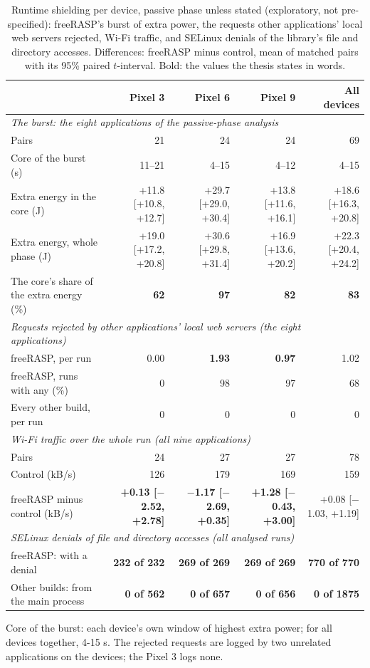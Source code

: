 \begin{table}[t]
\centering
\small
\caption{Runtime shielding per device, passive phase unless stated (exploratory, not pre-specified): freeRASP's burst of extra power, the requests other applications' local web servers rejected, Wi-Fi traffic, and SELinux denials of the library's file and directory accesses. Differences: freeRASP minus control, mean of matched pairs with its 95\% paired $t$-interval. Bold: the values the thesis states in words.}
\label{tab:freerasp-mechanism}
\begin{tabular}{lrrrr}
\toprule
\textbf{} & \textbf{Pixel 3} & \textbf{Pixel 6} & \textbf{Pixel 9} & \textbf{All devices} \\
\midrule
\multicolumn{5}{l}{\textit{The burst: the eight applications of the passive-phase analysis}} \\
Pairs & 21 & 24 & 24 & 69 \\
Core of the burst (s) & 11–21 & 4–15 & 4–12 & 4–15 \\
Extra energy in the core (J) & +11.8 [+10.8, +12.7] & +29.7 [+29.0, +30.4] & +13.8 [+11.6, +16.1] & +18.6 [+16.3, +20.8] \\
Extra energy, whole phase (J) & +19.0 [+17.2, +20.8] & +30.6 [+29.8, +31.4] & +16.9 [+13.6, +20.2] & +22.3 [+20.4, +24.2] \\
The core's share of the extra energy (\%) & \textbf{62} & \textbf{97} & \textbf{82} & \textbf{83} \\
\midrule
\multicolumn{5}{l}{\textit{Requests rejected by other applications' local web servers (the eight applications)}} \\
freeRASP, per run & 0.00 & \textbf{1.93} & \textbf{0.97} & 1.02 \\
freeRASP, runs with any (\%) & 0 & 98 & 97 & 68 \\
Every other build, per run & 0 & 0 & 0 & 0 \\
\midrule
\multicolumn{5}{l}{\textit{Wi-Fi traffic over the whole run (all nine applications)}} \\
Pairs & 24 & 27 & 27 & 78 \\
Control (kB/s) & 126 & 179 & 169 & 159 \\
freeRASP minus control (kB/s) & \textbf{+0.13 [$-$2.52, +2.78]} & \textbf{$-$1.17 [$-$2.69, +0.35]} & \textbf{+1.28 [$-$0.43, +3.00]} & +0.08 [$-$1.03, +1.19] \\
\midrule
\multicolumn{5}{l}{\textit{SELinux denials of file and directory accesses (all analysed runs)}} \\
freeRASP: with a denial & \textbf{232 of 232} & \textbf{269 of 269} & \textbf{269 of 269} & \textbf{770 of 770} \\
Other builds: from the main process & \textbf{0 of 562} & \textbf{0 of 657} & \textbf{0 of 656} & \textbf{0 of 1875} \\
\bottomrule
\end{tabular}
\par\smallskip\footnotesize Core of the burst: each device's own window of highest extra power; for all devices together, 4-15 s. The rejected requests are logged by two unrelated applications on the devices; the Pixel 3 logs none.
\end{table}

